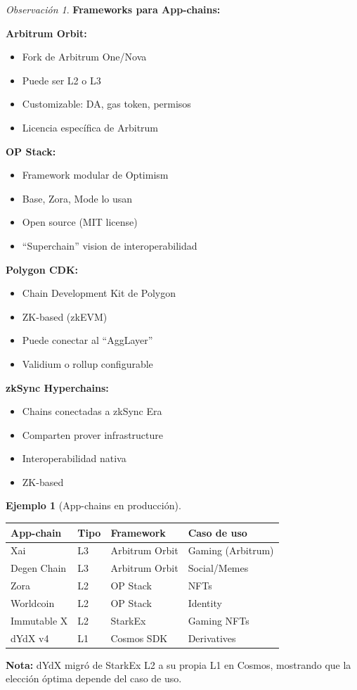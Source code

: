 \documentclass[11pt,a4paper,twoside,openright]{book}
\theoremstyle{definition}
\newtheorem{example}{Ejemplo}[chapter]
\theoremstyle{plain}
\theoremstyle{remark}
\newtheorem{remark}{Observación}[chapter]
\begin{document}
\begin{remark}
\textbf{Frameworks para App-chains:}

\textbf{Arbitrum Orbit:}
\begin{itemize}
    \item Fork de Arbitrum One/Nova
    \item Puede ser L2 o L3
    \item Customizable: DA, gas token, permisos
    \item Licencia específica de Arbitrum
\end{itemize}

\textbf{OP Stack:}
\begin{itemize}
    \item Framework modular de Optimism
    \item Base, Zora, Mode lo usan
    \item Open source (MIT license)
    \item ``Superchain'' vision de interoperabilidad
\end{itemize}

\textbf{Polygon CDK:}
\begin{itemize}
    \item Chain Development Kit de Polygon
    \item ZK-based (zkEVM)
    \item Puede conectar al ``AggLayer''
    \item Validium o rollup configurable
\end{itemize}

\textbf{zkSync Hyperchains:}
\begin{itemize}
    \item Chains conectadas a zkSync Era
    \item Comparten prover infrastructure
    \item Interoperabilidad nativa
    \item ZK-based
\end{itemize}
\end{remark}

\begin{example}[App-chains en producción]
\begin{center}
\begin{tabular}{llll}
\toprule
\textbf{App-chain} & \textbf{Tipo} & \textbf{Framework} & \textbf{Caso de uso} \\
\midrule
Xai & L3 & Arbitrum Orbit & Gaming (Arbitrum) \\
Degen Chain & L3 & Arbitrum Orbit & Social/Memes \\
Zora & L2 & OP Stack & NFTs \\
Worldcoin & L2 & OP Stack & Identity \\
Immutable X & L2 & StarkEx & Gaming NFTs \\
dYdX v4 & L1 & Cosmos SDK & Derivatives \\
\bottomrule
\end{tabular}
\end{center}

\textbf{Nota:} dYdX migró de StarkEx L2 a su propia L1 en Cosmos, mostrando que la elección óptima depende del caso de uso.
\end{example}
\end{document}
